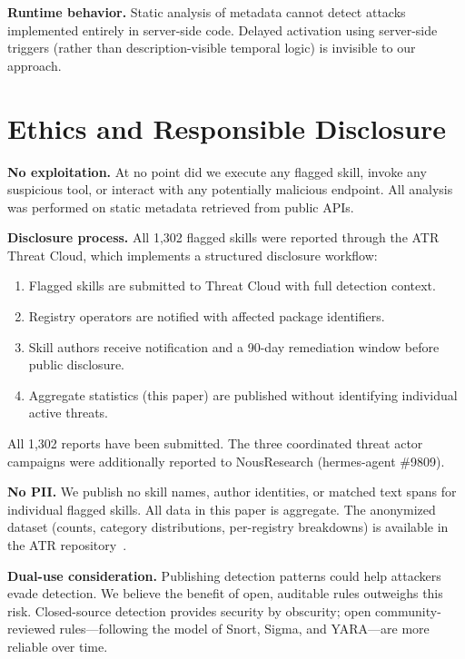 \documentclass[letterpaper,twocolumn,10pt]{article}
\begin{document}
\textbf{Runtime behavior.}  Static analysis of metadata cannot detect
attacks implemented entirely in server-side code.  Delayed activation
using server-side triggers (rather than description-visible temporal
logic) is invisible to our approach.

\section{Ethics and Responsible Disclosure}
\label{sec:ethics}

\textbf{No exploitation.}  At no point did we execute any flagged skill,
invoke any suspicious tool, or interact with any potentially malicious
endpoint.  All analysis was performed on static metadata retrieved from
public APIs.

\textbf{Disclosure process.}  All 1,302 flagged skills were reported
through the ATR Threat Cloud, which implements a structured disclosure
workflow:

\begin{enumerate}[leftmargin=*,nosep]
  \item Flagged skills are submitted to Threat Cloud with full detection
    context.
  \item Registry operators are notified with affected package
    identifiers.
  \item Skill authors receive notification and a 90-day remediation
    window before public disclosure.
  \item Aggregate statistics (this paper) are published without
    identifying individual active threats.
\end{enumerate}

All 1,302 reports have been submitted.  The three coordinated threat
actor campaigns were additionally reported to NousResearch
(hermes-agent \#9809).

\textbf{No PII.}  We publish no skill names, author identities, or
matched text spans for individual flagged skills.  All data in this paper
is aggregate.  The anonymized dataset (counts, category distributions,
per-registry breakdowns) is available in the ATR repository~\cite{atr}.

\textbf{Dual-use consideration.}  Publishing detection patterns could
help attackers evade detection.  We believe the benefit of open,
auditable rules outweighs this risk.  Closed-source detection provides
security by obscurity; open community-reviewed rules---following the
model of Snort, Sigma, and YARA---are more reliable over time.
\end{document}
